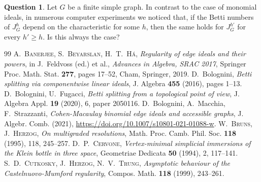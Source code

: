 \documentclass[11pt,oneside]{amsart}
\theoremstyle{plain}
\theoremstyle{definition}
\newtheorem{question}[theorem]{Question}
\newcommand{\rc}{\color{red}}
\begin{document}
\vspace{-4mm}
\begin{question}
Let $G$ be a finite simple graph. In contrast to the case of monomial ideals, in numerous computer experiments we noticed that, if the Betti numbers of $J_{G}^h$ depend on the characteristic for some $h$, then the same holds for $J_{G}^{h'}$ for every $h' \geq h$. Is this always the case?
\end{question}


\begin{thebibliography}{99}
 \textsc{A.~Banerjee, S.~Beyarslan, H.~T.~H\'a}, \textit{Regularity of edge ideals and their powers}, in J.~Feldvoss (ed.) et al., \textit{Advances in Algebra, SRAC 2017}, Springer Proc. Math. Stat. \textbf{277}, pages 17--52, Cham, Springer, 2019.
 {\sc D.~Bolognini}, \textit{Betti splitting via componentwise linear ideals}, J. Algebra \textbf{455} (2016), pages 1--13.
 {\sc D.~Bolognini, U.~Fugacci}, \textit{Betti splitting from a topological point of view}, J. Algebra Appl. \textbf{19} (2020), 6, paper 2050116.
 {\sc D.~Bolognini, A.~Macchia, F.~Strazzanti}, \textit{Cohen-Macaulay binomial edge ideals and accessible graphs}, J. Algebr. Comb. (2021), \href{https://doi.org/10.1007/s10801-021-01088-w}{https://doi.org/10.1007/s10801-021-01088-w}.
 \textsc{W.~Bruns, J.~Herzog}, \textit{On multigraded resolutions}, Math. Proc. Camb. Phil. Soc. \textbf{118} (1995), 118, 245--257.
 \textsc{D.~P.~Cervone}, \textit{Vertex-minimal simplicial immersions of the Klein bottle in three space}, Geometriae Dedicata \textbf{50} (1994), 2, 117--141.
 \textsc{S.~D.~Cutkosky, J.~Herzog, N.~V.~Trung}, \textit{Asymptotic behaviour of the Castelnuovo-Mumford regularity}, Compos. Math. \textbf{118} (1999), 243--261.

\end{thebibliography}
\end{document}
